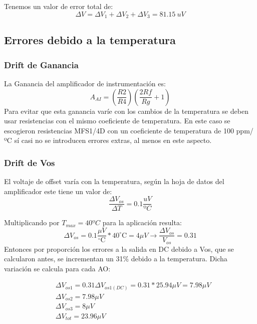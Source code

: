 Tenemos un valor de error total de:
\begin{equation*}
    \Delta V = \Delta V_1 + \Delta V_2 + \Delta V_3 = 81.15 ~uV
\end{equation*}
\subsection{Errores debido a la temperatura}
\subsubsection{Drift de Ganancia}
La Ganancia del amplificador de instrumentación es:
\begin{equation*}
    A_{AI} = \left(\frac{R2}{R4}\right) \left(\frac{2Rf}{Rg} + 1\right)
\end{equation*}
Para evitar que esta ganancia varíe con los cambios de la temperatura se deben usar
resistencias con el mismo coeficiente de temperatura. En este caso se escogieron resistencias
MFS1/4D con un coeficiente de temperatura de 100 ppm/ºC sí casi no se introducen errores extras, al menos en este aspecto.
\subsubsection{Drift de Vos}
El voltaje de offset varía con la temperatura, según la hoja de datos del amplificador este
tiene un valor de:
\begin{equation*}
    \frac{\Delta V_{os}}{\Delta T} = 0.1 \frac{uV}{ºC}
\end{equation*}

Multiplicando por $T_{max} = 40ºC$ para la aplicación resulta:
\begin{equation*}
\Delta V_{o s}=0.1 \frac{\mu V}{{ }^{\circ} \mathrm{C}} * 40^{\circ} \mathrm{C}=4 \mu V \rightarrow \frac{\Delta V_{o s}}{V_{o s}}=0.31
\end{equation*}
Entonces por proporción los errores a la salida en DC debido a Vos, que se calcularon antes,
se incrementan un 31\% debido a la temperatura. Dicha variación se calcula para cada AO:

\begin{equation*}
    \begin{aligned}
    &\Delta V_{o s 1}=0.31 \Delta V_{o s 1(D C)}=0.31 * 25.94 \mu V=7.98 \mu V \\
    &\Delta V_{o s 2}=7.98 \mu V \\
    &\Delta V_{o s 3}=8 \mu V \\
    &\Delta V_{t o t}=23.96 \mu V
    \end{aligned}
\end{equation*}
